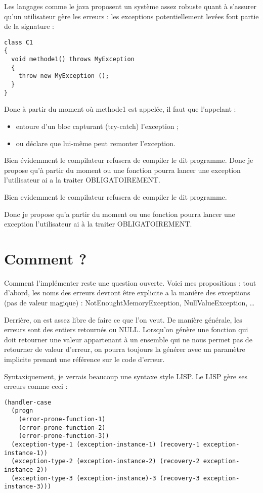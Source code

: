 \documentclass[french]{rtxreport}
\begin{document}
Les langages comme le java proposent un système assez robuste quant à s’assurer qu’un utilisateur gère les erreurs : les exceptions potentiellement levées font partie de la signature :

\lstset{language=java}
\begin{lstlisting}
class C1
{
  void methode1() throws MyException
  {
    throw new MyException ();
  }
}
\end{lstlisting}
\lstset{language=rathaxes}

Donc à partir du moment où methode1 est appelée, il faut que l’appelant : 
\begin{itemize}
	\item entoure d’un bloc capturant (try-catch) l’exception ; 
	\item ou déclare que lui-même peut remonter l’exception. 
\end{itemize}

Bien évidemment le compilateur refusera de compiler le dit programme. Donc je propose qu’à partir du moment ou une fonction pourra lancer une exception l’utilisateur ai a la traiter OBLIGATOIREMENT.

Bien evidemment le compilateur refusera de compiler le dit programme.

Donc je propose qu'a partir du moment ou une fonction pourra lancer une exception
l'utilisateur ai à la traiter OBLIGATOIREMENT.

\section{Comment ?}

Comment l’implémenter reste une question ouverte. Voici mes propositions : tout d’abord, les noms des erreurs devront être explicite a la manière des exceptions (pas de valeur magique) : NotEnoughtMemoryException, NullValueException, \ldots

Derrière, on est assez libre de faire ce que l’on veut. De manière générale, les erreurs sont des entiers retournés ou NULL. Lorsqu’on génère une fonction qui doit retourner une valeur appartenant à un ensemble qui ne nous permet pas de retourner de valeur d’erreur, on pourra toujours la générer avec un paramètre implicite prenant une référence sur le code d’erreur.

Syntaxiquement, je verrais beaucoup une syntaxe style LISP. Le LISP gère ses erreurs comme ceci :

\lstset{language=Lisp}
\begin{lstlisting}
(handler-case
  (progn
    (error-prone-function-1)
    (error-prone-function-2)
    (error-prone-function-3))
  (exception-type-1 (exception-instance-1) (recovery-1 exception-instance-1))
  (exception-type-2 (exception-instance-2) (recovery-2 exception-instance-2))
  (exception-type-3 (exception-instance)-3 (recovery-3 exception-instance-3)))
\end{lstlisting}
\end{document}
